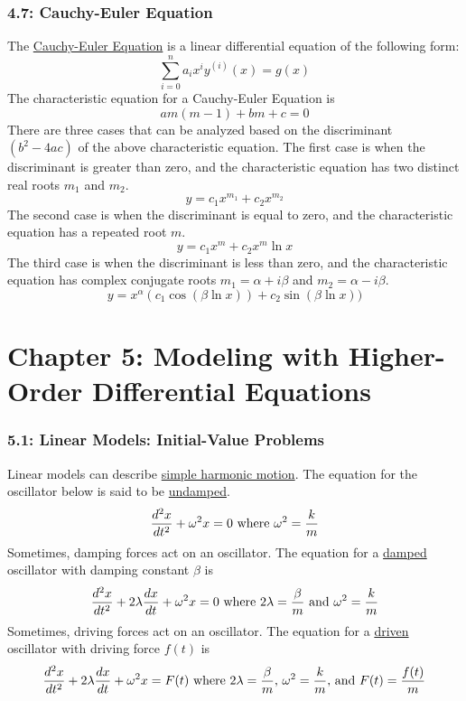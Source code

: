 \documentclass{article}
\begin{document}
\section*{4.7: Cauchy-Euler Equation}
The \underline{Cauchy-Euler Equation} is a linear differential equation of the following form:
\[\sum_{i=0}^na_ix^iy^{(i)}(x)=g(x)\]
The characteristic equation for a Cauchy-Euler Equation is
\[am(m-1)+bm+c=0\]
There are three cases that can be analyzed based on the discriminant \((b^2-4ac)\) of the above characteristic equation. The first case is when the discriminant is greater than zero, and the characteristic equation has two distinct real roots \(m_1\) and \(m_2\).
\[y=c_1x^{m_1}+c_2x^{m_2}\]
The second case is when the discriminant is equal to zero, and the characteristic equation has a repeated root \(m\).
\[y=c_1x^{m}+c_2x^{m}\ln x\]
The third case is when the discriminant is less than zero, and the characteristic equation has complex conjugate roots \(m_1=\alpha+i\beta\) and \(m_2=\alpha-i\beta\).
\[y=x^{\alpha}(c_1\cos(\beta\ln x))+c_2\sin(\beta\ln x))\]
\part*{Chapter 5: Modeling with Higher-Order Differential Equations}
\section*{5.1: Linear Models: Initial-Value Problems}
Linear models can describe \underline{simple harmonic motion}. The equation for the oscillator below is said to be \underline{undamped}.
\[\frac{d^2x}{dt^2}+\omega^2x=0\textnormal{ where }\omega^2=\frac{k}{m}\]
Sometimes, damping forces act on an oscillator. The equation for a \underline{damped} oscillator with damping constant \(\beta\) is
\[\frac{d^2x}{dt^2}+2\lambda\frac{dx}{dt}+\omega^2x=0\textnormal{ where }2\lambda=\frac{\beta}{m}\textnormal{ and }\omega^2=\frac{k}{m}\]
Sometimes, driving forces act on an oscillator. The equation for a \underline{driven} oscillator with driving force \(f(t)\) is
\[\frac{d^2x}{dt^2}+2\lambda\frac{dx}{dt}+\omega^2x=F(t)\textnormal{ where }2\lambda=\frac{\beta}{m}\textnormal{, }\omega^2=\frac{k}{m}\textnormal{, and }F(t)=\frac{f(t)}{m}\]
\end{document}
